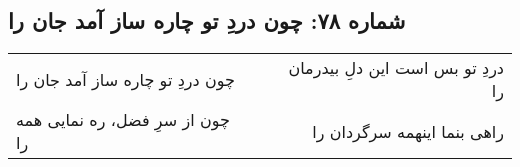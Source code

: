\begin{center}
\section*{شماره ۷۸: چون دردِ تو چاره ساز آمد جان را}
\label{sec:078}
\begin{longtable}{l p{0.5cm} r}
چون دردِ تو چاره ساز آمد جان را
&&
دردِ تو بس است این دلِ بیدرمان را
\\
چون از سرِ فضل، ره نمایی همه را
&&
راهی بنما اینهمه سرگردان را
\\
\end{longtable}
\end{center}
